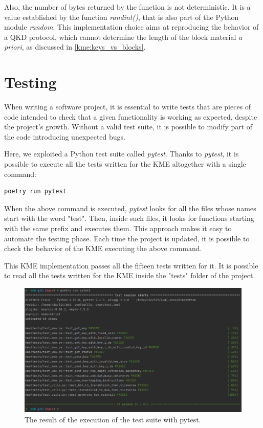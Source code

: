 Also, the number of bytes returned by the function is not deterministic. It is a value established by the function \textit{randint()}, that is also part of the Python module \textit{random}. This implementation choice aims at reproducing the behavior of a QKD protocol, which cannot determine the length of the block material \textit{a priori}, as discussed in \ref{kme:keys_vs_blocks}.

\section{Testing}
\label{testing}

When writing a software project, it is essential to write tests that are pieces of code intended to check that a given functionality is working as expected, despite the project's growth. Without a valid test suite, it is possible to modify part of the code introducing unexpected bugs.

Here, we exploited a Python test suite called \textit{pytest}. Thanks to \textit{pytest}, it is possible to execute all the tests written for the KME altogether with a single command:

\begin{verbatim}
poetry run pytest
\end{verbatim}

When the above command is executed, \textit{pytest} looks for all the files whose names start with the word "test". Then, inside such files, it looks for functions starting with the same prefix and executes them. This approach makes it easy to automate the testing phase. Each time the project is updated, it is possible to check the behavior of the KME executing the above command.

This KME implementation passes all the fifteen tests written for it. It is possible to read all the tests written for the KME inside the "tests" folder of the project.

\begin{figure}[H]
    \centering
    \includegraphics[width=1.0\textwidth]{Images/pytest.png}
    \caption{The result of the execution of the test suite with pytest.}
    \label{fig:pytest}
\end{figure}

